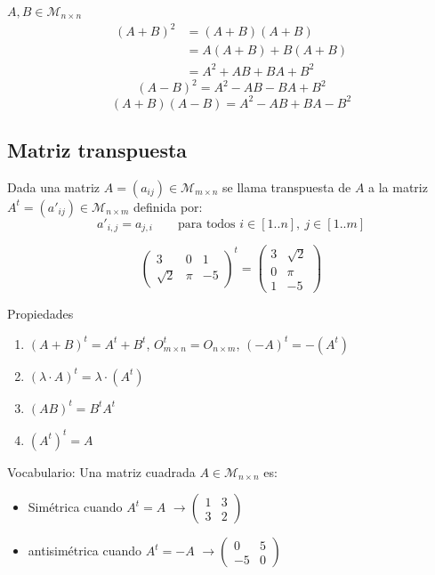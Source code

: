 \documentclass[11pt,a4paper]{article}
\newcommand{\M}{\mathcal{M}}
\begin{document}
\begin{ejemplo}
$A,B\in\M_{n\times n}$
\begin{align*}
(A+B)^2&=(A+B)(A+B)\\
&=A(A+B)+B(A+B)\\
&=A^2+AB+BA+B^2
\end{align*}
\[
(A-B)^2=A^2-AB-BA+B^2
\]
\[
(A+B)(A-B)=A^2-AB+BA-B^2
\]
\end{ejemplo}

\subsection{Matriz transpuesta}

\begin{definicion}
Dada una matriz $A=(a_{ij})\in\M_{m\times n}$ se llama transpuesta de $A$ a la matriz $A^t=(a'_{ij})\in\M_{n\times m}$ definida por:
\[
a'_{i,j}=a_{j,i}\qquad\text{para todos } i\in[1..n],\ j\in[1..m]
\]
\end{definicion}

\begin{ejemplo}
\[
\begin{pmatrix}3&0&1\\\sqrt2&\pi&-5\end{pmatrix}^t=\begin{pmatrix}3&\sqrt2\\0&\pi\\1&-5\end{pmatrix}
\]
\end{ejemplo}

Propiedades
\begin{enumerate}[label=(\arabic*)]
  \item $(A+B)^t=A^t+B^t$, \quad $O_{m\times n}^t=O_{n\times m}$, \quad $(-A)^t=-(A^t)$
  \item $(\lambda\cdot A)^t=\lambda\cdot(A^t)$
  \item $(AB)^t=B^tA^t$
  \item $(A^t)^t=A$
\end{enumerate}

Vocabulario: Una matriz cuadrada $A\in\M_{n\times n}$ es:
\begin{itemize}
  \item Simétrica cuando $A^t=A$ $\longrightarrow\begin{pmatrix}1&3\\3&2\end{pmatrix}$
  \item antisimétrica cuando $A^t=-A$ $\longrightarrow\begin{pmatrix}0&5\\-5&0\end{pmatrix}$
\end{itemize}
\end{document}
